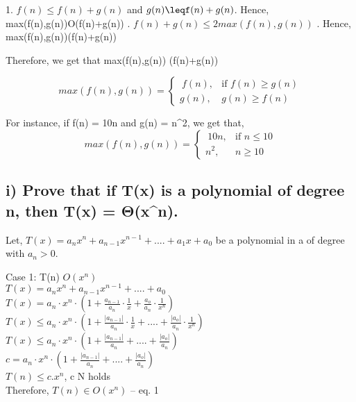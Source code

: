 \documentclass[11pt]{article}
\begin{document}
1. $f(n)\leq{f(n)+g(n)}$ and $g(n)\leqf(n)+g(n)$. Hence,
max(f(n),g(n))\in O(f(n)+g(n)) . $f(n)+g(n){\leq} 2 max(f(n),g(n))$ . Hence,
max(f(n),g(n))\in \Omega(f(n)+g(n)) 

Therefore, we get that max(f(n),g(n)) \in \Theta (f(n)+g(n))

\[
    max(f(n),g(n))= 
\begin{cases}
    \ f(n),& \text{if } f(n)\geq g(n)\\
    g(n),              & \text{} g(n)\geq f(n)
\end{cases}
\]

For instance, if f(n) = 10n and g(n) = {n^2}, we get that, 
\[
    max(f(n),g(n))= 
\begin{cases}
    \ 10n,& \text{if } n\leq 10\\
    n^2,              & \text{} n\geq 10
\end{cases}
\]

\subsection{i) Prove that if T(x) is a polynomial of degree n, then T(x) = Θ(x^n). }

Let, $T(x) = a_nx^n + a_{n-1}x^{n-1} + .... + a_1x + a_0 $ be a polynomial in a of degree with $a_n > 0$.

Case 1: T(n) \in $O(x^n)$ \\
$T(x) = a_nx^n + a_{n-1}x^{n-1} + .... + a_0 $ \\

$T(x) = a_n \cdot x^n \cdot (1 + \frac{a_{n-1}}{a_n} \cdot \frac{1}{x} + \frac{a_o}{a_n} \cdot \frac{1}{x^n} )$ \\

$T(x) \leq a_n \cdot x^n \cdot (1 + \frac{|a_{n-1}|}{a_n} \cdot \frac{1}{x} + .... + \frac{|a_o|}{a_n} \cdot \frac{1}{x^n} )$ \\

$T(x) \leq a_n \cdot x^n \cdot (1 + \frac{|a_{n-1}|}{a_n} + .... + \frac{|a_o|}{a_n} )$ \\

$c = a_n \cdot x^n \cdot (1 + \frac{|a_{n-1}|}{a_n} + .... + \frac{|a_o|}{a_n} )$ \\

$T(n) \leq c.x^n$, c \in N holds \\

Therefore, $T(n) \in O(x^n)$ -- eq. 1 \\ 
\end{document}
